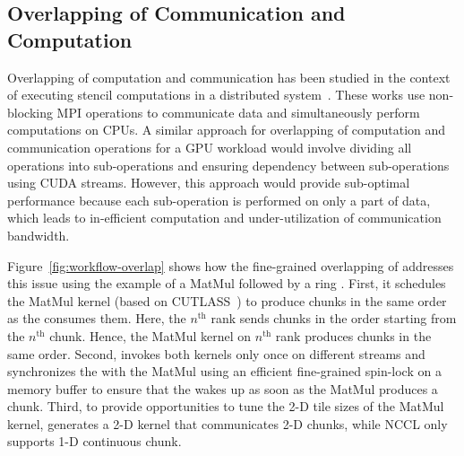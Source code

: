 \subsection{Overlapping of Communication and Computation}
\label{sec:overlap-impl}
Overlapping of computation and communication has been studied in the context of executing stencil computations in a distributed system~\cite{Barigou2017,6799131,10.1145/2503210.2503289, 7573826,distributed-halide,KOZIRIS20031138,7336201,10.1145/1810085.1810091,8121995,10.1007/978-3-319-58667-0_18,sc20:pencil}.
These works use non-blocking MPI operations to communicate data and simultaneously perform computations on CPUs.
A similar approach for overlapping of computation and communication operations for a GPU workload would involve dividing all operations into sub-operations and ensuring dependency between sub-operations using CUDA streams.
However, this approach would provide sub-optimal performance because each sub-operation is performed on only a part of data, which leads to in-efficient computation and under-utilization of communication bandwidth.

Figure~\ref{fig:workflow-overlap} shows how the fine-grained overlapping of \tool addresses this issue using the example of a MatMul followed by a ring \allreduce.
First, it schedules the MatMul kernel (based on CUTLASS~\cite{cutlass})
to produce chunks in the same order as the \allreduce consumes them.
Here, the $n^{\text{th}}$ rank sends chunks in the order starting from the $n^{\text{th}}$ chunk. 
Hence, the MatMul kernel on $n^{\text{th}}$ rank produces chunks in the same order.
Second, \tool invokes both kernels only once on different streams and synchronizes the \allreduce with the MatMul using an efficient fine-grained spin-lock on a memory buffer to ensure that the \allreduce wakes up as soon as the MatMul produces a chunk.
Third, to provide opportunities to tune the 2-D tile sizes of the MatMul kernel, \tool generates a 2-D \allreduce kernel that communicates 2-D chunks, while NCCL \allreduce only supports 1-D continuous chunk.


